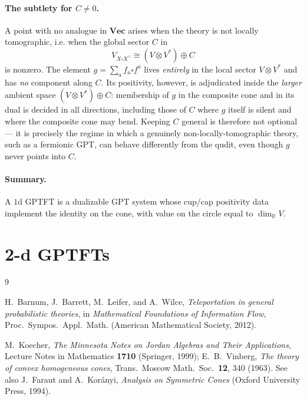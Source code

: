 \documentclass[prl,aps,10pt,superscriptaddress, floatfix]{revtex4-2}
\begin{document}
\paragraph*{The subtlety for $C\neq0$.}
A point with no analogue in $\mathbf{Vec}$ arises when the theory is not locally tomographic, i.e. when the global sector $C$ in
\[
V_{X\square X^\vee}\cong (V\otimes V^*)\oplus C
\]
is nonzero. The element $g=\sum_a f_a\square f^a$ lives \emph{entirely} in the local sector $V\otimes V^*$ and has \emph{no} component along $C$. Its positivity, however, is adjudicated inside the \emph{larger} ambient space $(V\otimes V^*)\oplus C$: membership of $g$ in the composite cone and in its dual is decided in all directions, including those of $C$ where $g$ itself is silent and where the composite cone may bend. Keeping $C$ general is therefore not optional --- it is precisely the regime in which a genuinely non-locally-tomographic theory, such as a fermionic GPT, can behave differently from the qudit, even though $g$ never points into $C$.

\paragraph*{Summary.}
A $1$d GPTFT is a dualizable GPT system whose cup/cap positivity data implement the identity on the cone, with value on the circle equal to $\dim_{\mathbb R}V$.

\section{2-d GPTFTs}

\begin{thebibliography}{9}

H.~Barnum, J.~Barrett, M.~Leifer, and A.~Wilce,
\emph{Teleportation in general probabilistic theories},
in \emph{Mathematical Foundations of Information Flow},
Proc.\ Sympos.\ Appl.\ Math. (American Mathematical Society, 2012).

M.~Koecher, \emph{The Minnesota Notes on Jordan Algebras and Their Applications},
Lecture Notes in Mathematics \textbf{1710} (Springer, 1999);
E.~B.~Vinberg, \emph{The theory of convex homogeneous cones},
Trans.\ Moscow Math.\ Soc.\ \textbf{12}, 340 (1963).
See also J.~Faraut and A.~Kor\'anyi, \emph{Analysis on Symmetric Cones}
(Oxford University Press, 1994).

\end{thebibliography}
\end{document}
